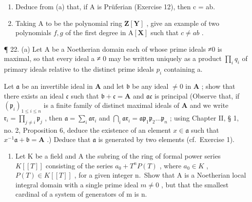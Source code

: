 \begin{enumerate}
\def\labelenumi{(\alph{enumi})}
\setcounter{enumi}{1}
\item
  Deduce from (a) that, if A is Prüferian (Exercise 12), then c = ab.
\item
  Taking A to be the polynomial ring \(\mathbf{Z}[\mathbf{Y}]\) , give an example of two polynomials \(f, g\) of the first degree in \(\mathrm{A}[\mathbf{X}]\) such that \(c \neq ab\) .
\end{enumerate}

¶ 22. (a) Let A be a Noetherian domain each of whose prime ideals ≠0 is maximal, so that every ideal a ≠ 0 may be written uniquely as a product \(\prod_{i} q_{i}\) of primary ideals relative to the distinct prime ideals \(p_{i}\) containing a.

Let \(\mathfrak{a}\) be an invertible ideal in \(\mathbf{A}\) and let \(\mathfrak{b}\) be any ideal \(\neq 0\) in \(\mathbf{A}\) ; show that there exists an ideal \(\mathfrak{c}\) such that \(\mathfrak{b} + \mathfrak{c} = \mathbf{A}\) and \(\mathfrak{ac}\) is principal (Observe that, if \((\mathfrak{p}_i)_{1 \leqslant i \leqslant n}\) is a finite family of distinct maximal ideals of \(\mathbf{A}\) and we write \(\mathfrak{r}_i = \prod_{j \neq i} \mathfrak{p}_j\) , then \(\mathfrak{a} = \sum_i \mathfrak{ar}_i\) and \(\bigcap_i \mathfrak{ar}_i = \mathfrak{ap}_1\mathfrak{p}_2 \ldots \mathfrak{p}_n\) ; using Chapter II, § 1, no. 2, Proposition 6, deduce the existence of an element \(x \in \mathfrak{a}\) such that \(x^{-1}\mathfrak{a} + \mathfrak{b} = \mathbf{A}\) .) Deduce that \(\mathfrak{a}\) is generated by two elements (cf.~Exercise 1).

\begin{enumerate}
\def\labelenumi{(\alph{enumi})}
\setcounter{enumi}{1}
\tightlist
\item
  Let K be a field and A the subring of the ring of formal power series \(K[[T]]\) consisting of the series \(a_{0} + T^{n}P(T)\) , where \(a_{0} \in K\) , \(P(T) \in K[[T]]\) , for a given integer n.~Show that A is a Noetherian local integral domain with a single prime ideal \(m \neq 0\) , but that the smallest cardinal of a system of generators of m is n.
\end{enumerate}

